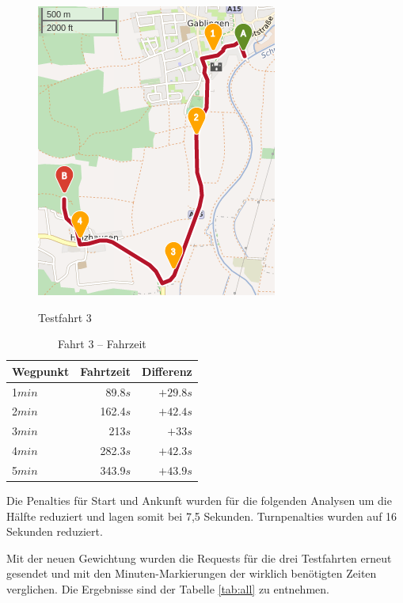 \begin{figure}[htb]
\centering
\caption{Testfahrt 3}
\label{fig:drive3}
\includegraphics[width = 0.40 \textwidth]{../media/Fahrt3crop.png} \\
\end{figure}

\begin{table}[]
\centering
\caption{Fahrt 3 -- Fahrzeit}
\label{tab:drive3}
\begin{tabular}{|l|r|r|}
\hline
Wegpunkt & Fahrtzeit & Differenz \\ \hline 
1$min$ &  89.8$s$ & $+29.8s$ \\
2$min$ &  162.4$s$ & $+42.4s$ \\
3$min$ &  213$s$ & $+33s$ \\
4$min$ &  282.3$s$ & $+42.3s$ \\
5$min$ &  343.9$s$ & $+43.9s$ \\
\hline
\end{tabular}
\end{table}

Die Penalties für Start und Ankunft wurden für die folgenden Analysen um die Hälfte reduziert und lagen somit bei 7,5 Sekunden.
Turnpenalties wurden auf 16 Sekunden reduziert.

Mit der neuen Gewichtung wurden die Requests für die drei Testfahrten erneut gesendet und mit den Minuten-Markierungen der wirklich benötigten Zeiten verglichen.
Die Ergebnisse sind der Tabelle \ref{tab:all} zu entnehmen.

